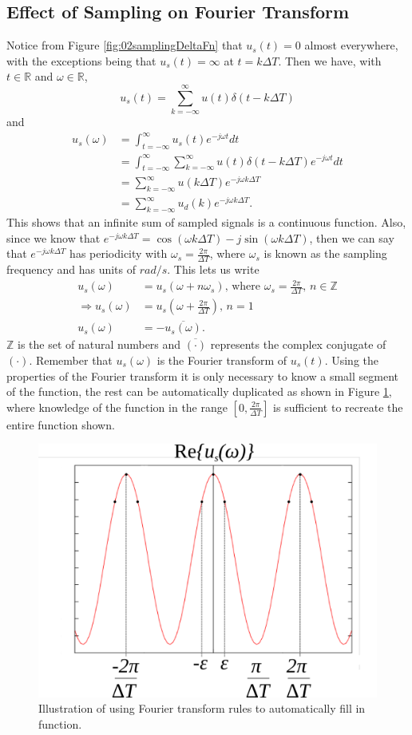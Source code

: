 \documentclass[lecture,12pt,]{pcms-l}
\theoremstyle{example}
\newcommand{\tint}{\int_{t=-\infty}^\infty}
\newcommand{\w}{\omega}
\newcommand{\emjwt}{e^{-j\omega t}}
\begin{document}
\subsection{Effect of Sampling on Fourier Transform}
Notice from Figure \ref{fig:02samplingDeltaFn} that $u_s(t) = 0$ almost everywhere, with the exceptions being that $u_s(t) = \infty$ at $t=k\Delta T$. Then we have, with $t\in\mathbb{R}$ and $\w\in\mathbb{R}$,
$$u_s(t) = \sum_{k=-\infty}^\infty u(t)\delta(t-k\Delta T)$$
and
\begin{align*}
u_s(\w) &= \tint u_s(t)\emjwt dt \\
&= \tint \sum_{k=-\infty}^\infty u(t)\delta(t-k\Delta T)\emjwt dt \\
&= \sum_{k=-\infty}^\infty u(k\Delta T) e^{-j\w k\Delta T} \\
&= \sum_{k=-\infty}^\infty u_d(k) e^{-j\w k\Delta T}.
\end{align*}
This shows that an infinite sum of sampled signals is a continuous function. Also, since we know that $e^{-j\w k\Delta T} = \cos(\w k\Delta T) - j\sin(\w k\Delta T)$, then we can say that $e^{-j\w k\Delta T}$ has periodicity with $\w_s = \frac{2\pi}{\Delta T}$, where $\w_s$ is known as the sampling frequency and has units of $rad/s$. This lets us write
\begin{align*}
u_s(\w) &= u_s(\w+n\w_s) \text{, where } \w_s = \frac{2\pi}{\Delta T} \text{, } n\in\mathbb{Z} \\
\Rightarrow u_s(\w) &= u_s(\w+\frac{2\pi}{\Delta T}) \text{, } n=1 \\
u_s(\w) &= -\overline{u_s(\w)}.
\end{align*}
$\mathbb{Z}$ is the set of natural numbers and $\overline{(\cdot)}$ represents the complex conjugate of $(\cdot)$. Remember that $u_s(\w)$ is the Fourier transform of $u_s(t)$. Using the properties of the Fourier transform it is only necessary to know a small segment of the function, the rest can be automatically duplicated as shown in Figure \ref{fig:02sin}, where knowledge of the function in the range $[0,\frac{2\pi}{\Delta T}]$ is sufficient to recreate the entire function shown.
\begin{figure}[ht!]
	\centering
	\includegraphics[width=.5\textwidth]{images/02sin}
	\caption{Illustration of using Fourier transform rules to automatically fill in function.}
	\label{fig:02sin}
\end{figure}
\end{document}
